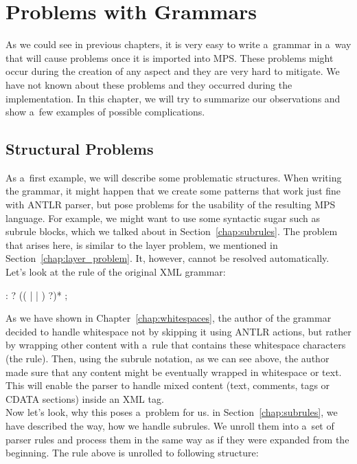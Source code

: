 \chapter{Problems with Grammars}
\label{chap:problems_with_grammars}

As we could see in previous chapters, it is very easy to write a~grammar in a~way that will cause problems once it is imported into MPS.
These problems might occur during the creation of any aspect and they are very hard to mitigate.
We have not known about these problems and they occurred during the implementation.
In this chapter, we will try to summarize our observations and show a~few examples of possible complications.
\\

\section{Structural Problems}

As a~first example, we will describe some problematic structures.
When writing the grammar, it might happen that we create some patterns that work just fine with ANTLR parser, but pose problems for the usability of the resulting MPS language.
For example, we might want to use some syntactic sugar such as subrule blocks, which we talked about in Section~\ref{chap:subrules}.
The problem that arises here, is similar to the layer problem, we mentioned in Section~\ref{chap:layer_problem}.
It, however, cannot be resolved automatically.
Let's look at the  rule of the original XML grammar:

\begin{antlr}
	 :   ? (( |  | ) ?)* ;
\end{antlr}

As we have shown in Chapter~\ref{chap:whitespaces}, the author of the grammar decided to handle whitespace not by skipping it using ANTLR actions, but rather by wrapping other content with a~rule that contains these whitespace characters (the  rule).
Then, using the subrule notation, as we can see above, the author made sure that any content might be eventually wrapped in whitespace or text.
This will enable the parser to handle mixed content (text, comments, tags or CDATA sections) inside an XML tag.
\\

Now let's look, why this poses a~problem for us.
in Section~\ref{chap:subrules}, we have described the way, how we handle subrules.
We unroll them into a~set of parser rules and process them in the same way as if they were expanded from the beginning.
The rule above is unrolled to following structure:

